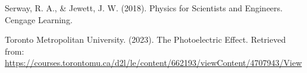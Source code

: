 
\begin{thebibliography}{12}

Serway, R. A., & Jewett, J. W. (2018). Physics for Scientists and Engineers. Cengage Learning.

Toronto Metropolitan University. (2023). The Photoelectric Effect.
Retrieved from: \url{https://courses.torontomu.ca/d2l/le/content/662193/viewContent/4707943/View}

\end{thebibliography}


